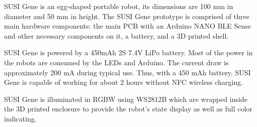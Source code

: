 \documentclass[manuscript,screen]{acmart}
\begin{document}
SUSI Gene is an egg-shaped portable robot, its dimensions are 100 mm in diameter and 50 mm in height.
The SUSI Gene prototype is comprised of three main hardware components: the main PCB with an Arduino NANO BLE Sense and other necessary components on it, a battery, and a 3D printed shell.

SUSI Gene is powered by a 450mAh 2S 7.4V LiPo battery. Most of the power in the robots are consumed by the LEDs and Arduino. The current draw is approximately 200 mA during typical use. Thus, with a 450 mAh battery, SUSI Gene is capable of working for about 2 hours without NFC wireless charging.

SUSI Gene is illuminated in RGBW using WS2812B which are wrapped inside the 3D printed enclosure to provide the robot’s state display as well as full color indicating.
\end{document}
